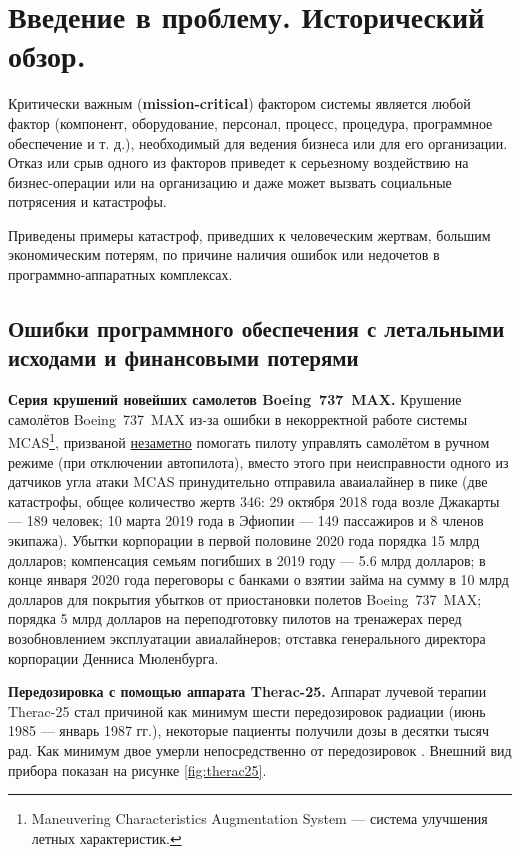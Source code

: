 \chapter{Введение в проблему. Исторический обзор.}\label{ch:ch1}

Критически важным (\textbf{mission-critical}) фактором системы является любой фактор
(компонент, оборудование, персонал, процесс, процедура, программное обеспечение и т. д.),
необходимый для ведения бизнеса или для его организации.
Отказ или срыв одного из факторов приведет к серьезному воздействию на бизнес-операции или на организацию
и даже может вызвать социальные потрясения и катастрофы.

Приведены примеры катастроф, приведших к человеческим жертвам, большим экономическим потерям,
по причине наличия ошибок или недочетов в программно-аппаратных комплексах.


\section{Ошибки программного обеспечения с летальными исходами и финансовыми потерями}

\textbf{Серия крушений новейших самолетов Boeing~737~MAX.}
Крушение самолётов Boeing~737~MAX из-за ошибки в некорректной работе системы MCAS\footnote{Maneuvering Characteristics Augmentation System ---
    система улучшения летных характеристик.},
призваной \underline{незаметно} помогать пилоту управлять самолётом в ручном режиме (при отключении автопилота),
вместо этого при неисправности одного из датчиков угла атаки MCAS принудительно отправила аваиалайнер в пике
(две катастрофы, общее количество жертв 346:
    29 октября 2018 года возле Джакарты --- 189 человек;
    10 марта 2019 года в Эфиопии --- 149 пассажиров и 8 членов экипажа).
Убытки корпорации в первой половине 2020 года порядка 15 млрд долларов;
компенсация семьям погибших в 2019 году --- 5.6 млрд долларов;
в конце января 2020 года переговоры с банками о взятии займа на сумму в 10 млрд долларов для покрытия убытков от приостановки полетов Boeing~737~MAX;
порядка 5 млрд долларов на переподготовку пилотов на тренажерах перед возобновлением эксплуатации авиалайнеров;
отставка генерального директора корпорации Денниса Мюленбурга.


\textbf{Передозировка с помощью аппарата Therac-25.}
Аппарат лучевой терапии Therac-25 стал причиной как минимум шести передозировок радиации (июнь 1985 --- январь 1987 гг.),
некоторые пациенты получили дозы в десятки тысяч рад. Как минимум двое умерли непосредственно от передозировок \cite{journal:computer:1993:therac25}.
Внешний вид прибора показан на рисунке \ref{fig:therac25}.

